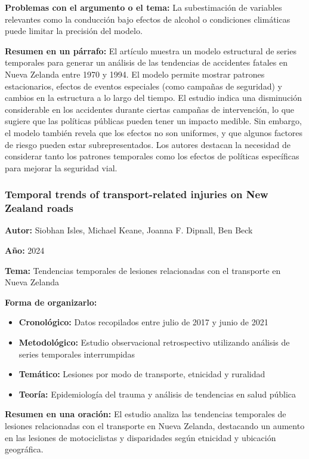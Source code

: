 \documentclass{book}
\begin{document}
\textbf{Problemas con el argumento o el tema:} La subestimación de variables relevantes como la conducción bajo efectos de alcohol o condiciones climáticas puede limitar la precisión del modelo.

\textbf{Resumen en un párrafo:} El artículo muestra un modelo estructural de series temporales para generar un análisis de las tendencias de accidentes fatales en Nueva Zelanda entre 1970 y 1994. El modelo permite mostrar patrones estacionarios, efectos de eventos especiales (como campañas de seguridad) y cambios en la estructura a lo largo del tiempo. El estudio indica una disminución considerable en los accidentes durante ciertas campañas de intervención, lo que sugiere que las políticas públicas pueden tener un impacto medible. Sin embargo, el modelo también revela que los efectos no son uniformes, y que algunos factores de riesgo pueden estar subrepresentados. Los autores destacan la necesidad de considerar tanto los patrones temporales como los efectos de políticas específicas para mejorar la seguridad vial.

\subsubsection{Temporal trends of transport-related injuries on New Zealand roads}
\textbf{Autor:} Siobhan Isles, Michael Keane, Joanna F. Dipnall, Ben Beck

\textbf{Año:} 2024

\textbf{Tema:} Tendencias temporales de lesiones relacionadas con el transporte en Nueva Zelanda

\textbf{Forma de organizarlo:}
\begin{itemize}
\setlength{\itemindent}{0.5in}
    \item \textbf{Cronológico:} Datos recopilados entre julio de 2017 y junio de 2021
    \item \textbf{Metodológico:} Estudio observacional retrospectivo utilizando análisis de series temporales interrumpidas
    \item \textbf{Temático:} Lesiones por modo de transporte, etnicidad y ruralidad
    \item \textbf{Teoría:} Epidemiología del trauma y análisis de tendencias en salud pública
\end{itemize}

\textbf{Resumen en una oración:} El estudio analiza las tendencias temporales de lesiones relacionadas con el transporte en Nueva Zelanda, destacando un aumento en las lesiones de motociclistas y disparidades según etnicidad y ubicación geográfica.
\end{document}
